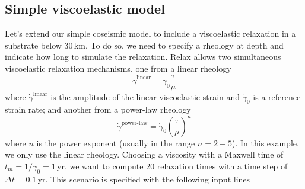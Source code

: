 \documentclass[10pt]{article}
\begin{document}
\subsection{Simple viscoelastic model}

Let's extend our simple coseismic model to include a viscoelastic relaxation in a substrate below 30\,km. To do so, we need to specify a rheology at depth and indicate how long to simulate the relaxation. Relax allows two simultaneous viscoelastic relaxation mechanisms, one from a linear rheology
\begin{equation}\label{eqn:viscoelastic}
\dot{\gamma}^{\text{linear}}=\dot{\gamma}_0\frac{\tau}{\mu}
\end{equation}
where $\dot{\gamma}^{\text{linear}}$ is the amplitude of the linear viscoelastic strain and $\dot{\gamma}_0$ is a reference strain rate; and another from a power-law rheology
\begin{equation}
\dot{\gamma}^{\text{power-law}}=\dot{\gamma}_0\left(\frac{\tau}{\mu}\right)^{n}
\end{equation}
where $n$ is the power exponent (usually in the range $n=2-5$). In this example, we only use the linear rheology. Choosing a viscosity with a Maxwell time of $t_m=1/\dot{\gamma}_0=1$\,yr, we want to compute 20 relaxation times with a time step of $\Delta t=0.1\,$yr. This scenario is specified with the following input lines
\end{document}
